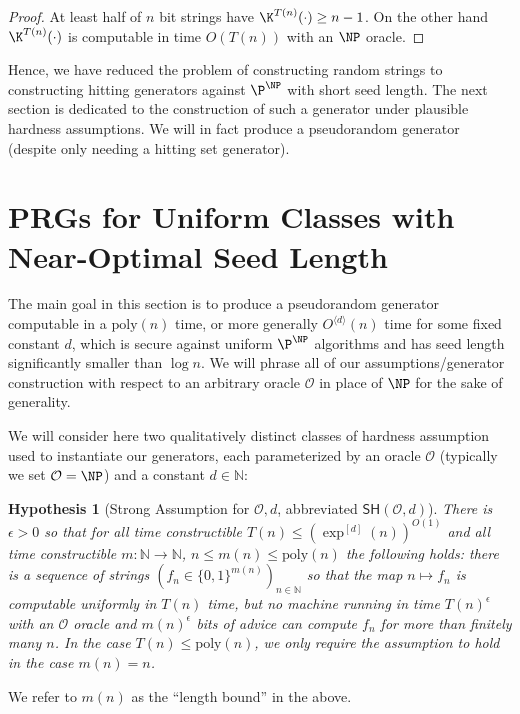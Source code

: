 \documentclass[11pt]{article}
\newtheorem{hypothesis}{Hypothesis}
\newcommand{\B}{\{0,1\}}
\newcommand{\od}[1]{O^{\langle #1 \rangle}}
\newcommand{\SH}{\mathsf{SH}}
\renewcommand{\poly}{\mathrm{poly}}
\begin{document}
\begin{proof}
At least half of $n$ bit strings have $\K^{T(n)}(\cdot) \geq n-1$. On the other hand $\K^{T(n)}(\cdot)$ is computable in time $O(T(n))$ with an $\NP$ oracle. 
\end{proof}

Hence, we have reduced the problem of constructing random strings to constructing hitting generators against $\P^{\NP}$ with short seed length. The next section is dedicated to the construction of such a generator under plausible hardness assumptions. We will in fact produce a pseudorandom generator (despite only needing a hitting set generator).

\section{PRGs for Uniform Classes with Near-Optimal Seed Length}\label{sec:PRG}
The main goal in this section is to produce a pseudorandom generator computable in a $\poly(n)$ time, or more generally $\od{d}(n)$ time for some fixed constant $d$, which is secure against uniform $\P^{\NP}$ algorithms and has seed length significantly smaller than $\log n$. We will phrase all of our assumptions/generator construction with respect to an arbitrary oracle $\mathcal{O}$ in place of $\NP$ for the sake of generality.

We will consider here two qualitatively distinct classes of hardness assumption used to instantiate our generators, each parameterized by an oracle $\mathcal{O}$ (typically we set $\mathcal{O}=\NP$) and a constant $d\in \mathbb{N}$: 
\begin{hypothesis}[Strong Assumption for $\mathcal{O},d$, abbreviated $\SH(\mathcal{O},d)$]\label{hyp:strong}
There is $\epsilon > 0$ so that for all time constructible $T(n) \leq (\exp^{[d]}(n))^{O(1)}$ and all time constructible $m: \mathbb{N} \to \mathbb{N}$, $n \leq m(n) \leq \poly(n)$ the following holds: there is a sequence of strings $(f_n\in \B^{m(n)} )_{n \in \mathbb{N}}$ so that the map $n \mapsto f_n$ is computable uniformly in $T(n)$ time, but no machine running in time $T(n)^{\epsilon}$ with an $\mathcal{O}$ oracle and $m(n)^\epsilon$ bits of advice can compute $f_n$ for more than finitely many $n$. In the case $T(n) \leq \poly(n)$, we only require the assumption to hold in the case $m(n) = n$. 
\end{hypothesis}

We refer to $m(n)$ as the ``length bound'' in the above.
\end{document}
